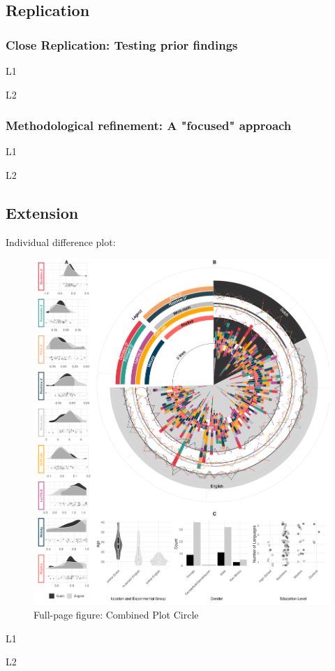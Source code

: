 \subsection{Replication}

\subsubsection{Close Replication: Testing prior findings}

L1 

L2

\subsubsection{Methodological refinement: A "focused" approach}

L1 

L2

\subsection{Extension}

Individual difference plot:
\begin{figure}[p]  %
    \centering
    \includegraphics[width=\textwidth,height=\textheight,keepaspectratio]{viz/combined_plot_circle.png}
    \caption{Full-page figure: Combined Plot Circle}
    \label{fig:combined_plot}
\end{figure}

L1 

L2


